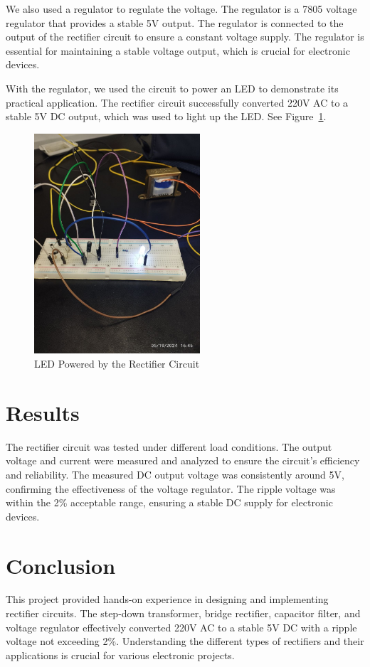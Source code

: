 \documentclass{zc-ust-hw}
\begin{document}
We also used a regulator to regulate the voltage. The regulator is a 7805
voltage regulator that provides a stable 5V output. The regulator is connected
to the output of the rectifier circuit to ensure a constant voltage supply. The
regulator is essential for maintaining a stable voltage output, which is
crucial for electronic devices.

With the regulator, we used the circuit to power an LED to demonstrate its practical
application. The rectifier circuit successfully converted 220V AC to a stable 5V
DC output, which was used to light up the LED. See Figure~\ref{fig:led-lighting}.

\begin{figure}[h]
  \begin{center}
    \includegraphics[width=0.55\textwidth]{figures/photo_2024-05-24_00-16-41.jpg}
  \end{center}
  \caption{LED Powered by the Rectifier Circuit}
  \label{fig:led-lighting}
\end{figure}

\section{Results}
The rectifier circuit was tested under different load
conditions. The output voltage and current were measured and analyzed to ensure
the circuit's efficiency and reliability. The measured DC output voltage was
consistently around 5V, confirming the effectiveness of the voltage regulator.
The ripple voltage was within the 2\% acceptable range, ensuring a stable DC
supply for electronic devices.

\section{Conclusion}
This project provided hands-on experience in designing and implementing
rectifier circuits. The step-down transformer, bridge rectifier, capacitor
filter, and voltage regulator effectively converted 220V AC to a stable 5V DC
with a ripple voltage not exceeding 2\%. Understanding the different types of
rectifiers and their applications is crucial for various electronic projects.
\end{document}
